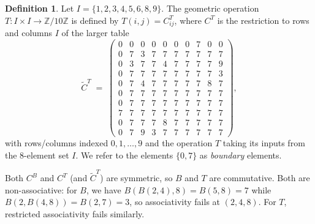 \documentclass[submission,copyright,creativecommons]{eptcs}
\theoremstyle{plain}
\theoremstyle{definition}
\newtheorem{definition}[theorem]{Definition}
\theoremstyle{remark}
\begin{document}
\begin{definition}\label{def:T}
Let $I = \{1, 2, 3, 4, 5, 6, 8, 9\}$. The geometric operation $T : I \times
I \to \mathbb{Z}/10\mathbb{Z}$ is defined by $T(i, j) = C^T_{ij}$, where
$C^T$ is the restriction to rows and columns $I$ of the larger table
\[
\widetilde{C}^T \;=\;
\begin{pmatrix}
0 & 0 & 0 & 0 & 0 & 0 & 0 & 7 & 0 & 0 \\
0 & 7 & 3 & 7 & 7 & 7 & 7 & 7 & 7 & 7 \\
0 & 3 & 7 & 7 & 4 & 7 & 7 & 7 & 7 & 9 \\
0 & 7 & 7 & 7 & 7 & 7 & 7 & 7 & 7 & 3 \\
0 & 7 & 4 & 7 & 7 & 7 & 7 & 7 & 8 & 7 \\
0 & 7 & 7 & 7 & 7 & 7 & 7 & 7 & 7 & 7 \\
0 & 7 & 7 & 7 & 7 & 7 & 7 & 7 & 7 & 7 \\
7 & 7 & 7 & 7 & 7 & 7 & 7 & 7 & 7 & 7 \\
0 & 7 & 7 & 7 & 8 & 7 & 7 & 7 & 7 & 7 \\
0 & 7 & 9 & 3 & 7 & 7 & 7 & 7 & 7 & 7
\end{pmatrix},
\]
with rows/columns indexed $0, 1, \dots, 9$ and the operation $T$ taking
its inputs from the $8$-element set $I$. We refer to the elements
$\{0, 7\}$ as \emph{boundary} elements.
\end{definition}

Both $C^B$ and $C^T$ (and $\widetilde{C}^T$) are symmetric, so $B$ and $T$
are commutative. Both are non-associative: for $B$, we have $B(B(2, 4), 8)
= B(5, 8) = 7$ while $B(2, B(4, 8)) = B(2, 7) = 3$, so associativity fails
at $(2, 4, 8)$. For $T$, restricted associativity fails similarly.
\end{document}
